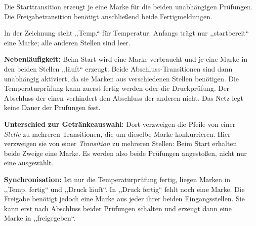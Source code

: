 \begin{loesung}
Die Starttransition erzeugt je eine Marke für die beiden unabhängigen Prüfungen.
Die Freigabetransition benötigt anschließend beide Fertigmeldungen.
\begin{center}
\end{center}
In der Zeichnung steht ,,Temp.`` für Temperatur. Anfangs trägt nur
,,startbereit`` eine Marke; alle anderen Stellen sind leer.

\textbf{Nebenläufigkeit:} Beim Start wird eine Marke verbraucht und je eine Marke
in den beiden Stellen ,,läuft`` erzeugt. Beide Abschluss-Transitionen sind dann
unabhängig aktiviert, da sie Marken aus verschiedenen Stellen benötigen.
Die Temperaturprüfung kann zuerst fertig werden oder die Druckprüfung.
Der Abschluss der einen verhindert den Abschluss der anderen nicht.
Das Netz legt keine Dauer der Prüfungen fest.

\textbf{Unterschied zur Getränkeauswahl:} Dort verzweigen die Pfeile von einer
\emph{Stelle} zu mehreren Transitionen, die um dieselbe Marke konkurrieren.
Hier verzweigen sie von einer \emph{Transition} zu mehreren Stellen:
Beim Start erhalten beide Zweige eine Marke. Es werden also beide Prüfungen
angestoßen, nicht nur eine ausgewählt.

\textbf{Synchronisation:} Ist nur die Temperaturprüfung fertig, liegen Marken
in ,,Temp. fertig`` und ,,Druck läuft``. In ,,Druck fertig`` fehlt noch eine Marke.
Die Freigabe benötigt jedoch eine Marke aus jeder ihrer beiden Eingangsstellen.
Sie kann erst nach Abschluss beider Prüfungen schalten und erzeugt dann eine
Marke in ,,freigegeben``.


\end{loesung}
